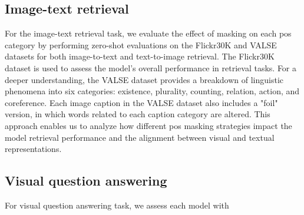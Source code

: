 \subsection{Image-text retrieval}
For the image-text retrieval task, we evaluate the effect of masking on each \acrshort{pos} category by performing zero-shot evaluations on the Flickr30K \cite{flickr30k} and VALSE \cite{valse} datasets for both image-to-text and text-to-image retrieval. 
The Flickr30K dataset is used to assess the model's overall performance in retrieval tasks. 
For a deeper understanding, the VALSE dataset provides a breakdown of linguistic phenomena into six categories: existence, plurality, counting, relation, action, and coreference. 
Each image caption in the VALSE dataset also includes a "foil" version, in which words related to each caption category are altered. 
This approach enables us to analyze how different \acrshort{pos} masking strategies impact the model retrieval performance and the alignment between visual and textual representations.

\subsection{Visual question answering}
For visual question answering task, we assess each model with

